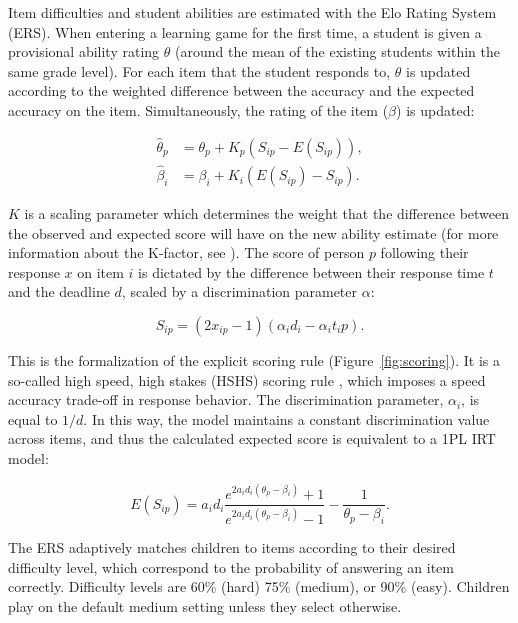 \documentclass[12pt]{article}
\begin{document}
Item difficulties and student abilities are estimated with the Elo Rating System (ERS). When entering a learning game for the first time, a student is given a provisional ability rating $\theta$ (around the mean of the existing students within the same grade level). For each item that the student responds to, $\theta$ is updated according to the weighted difference between the accuracy and the expected accuracy on the item. Simultaneously, the rating of the item ($\beta$) is updated: 

\begin{align}
    \hat{\theta}_p &= \theta_p + K_p(S_{ip} - E(S_{ip})), \\
    \hat{\beta}_i &= \beta_i + K_i(E(S_{ip}) - S_{ip}).
\end{align}

\noindent $K$ is a scaling parameter which determines the weight that the difference between the observed and expected score will have on the new ability estimate (for more information about the K-factor, see \parencite{vermeiren2024balancing}). The score of person $p$ following their response $x$ on item $i$ is dictated by the difference between their response time $t$ and the deadline $d$, scaled by a discrimination parameter $\alpha$:

\begin{equation}
    S_{ip} = (2x_{ip} - 1)(\alpha_id_i - \alpha_it_ip).
    \label{eq:scoring}
\end{equation}

\noindent This is the formalization of the explicit scoring rule (Figure~\ref{fig:scoring}). It is a so-called high speed, high stakes (HSHS) scoring rule \parencite{maris2012speed}, which imposes a speed accuracy trade-off in response behavior. The discrimination parameter, $\alpha_i$, is equal to $1/d$. In this way, the model maintains a constant discrimination value across items, and thus the calculated expected score is equivalent to a 1PL IRT model: 

\begin{equation}
    E(S_{ip}) = a_i d_i \frac{e^{2 a_i d_i (\theta_p - \beta_i)} + 1}{e^{2 a_i d_i (\theta_p - \beta_i)} - 1} - \frac{1}{\theta_p - \beta_i}.
\end{equation}

\noindent The ERS adaptively matches children to items according to their desired difficulty level, which correspond to the probability of answering an item correctly. Difficulty levels are 60\% (hard) 75\% (medium), or 90\% (easy). Children play on the default medium setting unless they select otherwise. 
\end{document}
